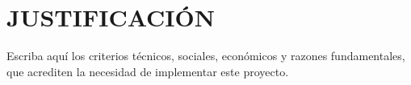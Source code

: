 \section*{JUSTIFICACIÓN}
\justifying

Escriba aquí los criterios técnicos, sociales, económicos y razones fundamentales, que acrediten la necesidad de implementar este proyecto.